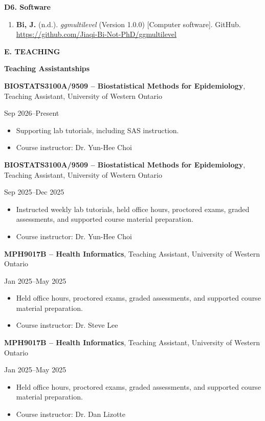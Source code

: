 \documentclass[10pt]{article}
\newcommand{\cvsection}[1]{%
  \Needspace{5\baselineskip}%
  \vspace{0.65em}%
  {\large\bfseries\color{sectiongray} #1}\par
  \vspace{0.18em}%
}
\newcommand{\cvsubsection}[1]{%
  \Needspace{4\baselineskip}%
  \vspace{0.3em}%
  {\bfseries #1}\par
}
\newcommand{\cvdated}[2]{%
  \noindent
  \begin{minipage}[t]{\dimexpr\linewidth-1.35in\relax}
    \raggedright\strut #1\strut
  \end{minipage}%
  \hfill
  \begin{minipage}[t]{1.18in}
    \raggedleft\strut{\color{dategray} #2}%
  \end{minipage}\par
}
\newcommand{\cvteachingentry}[2]{%
  \Needspace{7\baselineskip}%
  \cvdated{#1}{#2}%
}
\begin{document}
\cvsubsection{D6. Software}
\begin{enumerate}[leftmargin=1.6em]
\item \textbf{Bi, J.} (n.d.). \emph{ggmultilevel} (Version 1.0.0) [Computer software]. GitHub.\\
\url{https://github.com/Jiaqi-Bi-Not-PhD/ggmultilevel}
\end{enumerate}

\cvsection{E. TEACHING}

\cvsubsection{Teaching Assistantships}
\cvteachingentry{\textbf{BIOSTATS3100A/9509 -- Biostatistical Methods for Epidemiology}, Teaching Assistant, University of Western Ontario}{Sep 2026--Present}
\begin{itemize}[leftmargin=1.6em,label=--]
\item Supporting lab tutorials, including SAS instruction.
\item Course instructor: Dr. Yun-Hee Choi
\end{itemize}

\cvteachingentry{\textbf{BIOSTATS3100A/9509 -- Biostatistical Methods for Epidemiology}, Teaching Assistant, University of Western Ontario}{Sep 2025--Dec 2025}
\begin{itemize}[leftmargin=1.6em,label=--]
\item Instructed weekly lab tutorials, held office hours, proctored exams, graded assessments, and supported course material preparation.
\item Course instructor: Dr. Yun-Hee Choi
\end{itemize}

\cvteachingentry{\textbf{MPH9017B -- Health Informatics}, Teaching Assistant, University of Western Ontario}{Jan 2025--May 2025}
\begin{itemize}[leftmargin=1.6em,label=--]
\item Held office hours, proctored exams, graded assessments, and supported course material preparation.
\item Course instructor: Dr. Steve Lee
\end{itemize}

\cvteachingentry{\textbf{MPH9017B -- Health Informatics}, Teaching Assistant, University of Western Ontario}{Jan 2025--May 2025}
\begin{itemize}[leftmargin=1.6em,label=--]
\item Held office hours, proctored exams, graded assessments, and supported course material preparation.
\item Course instructor: Dr. Dan Lizotte
\end{itemize}
\end{document}
